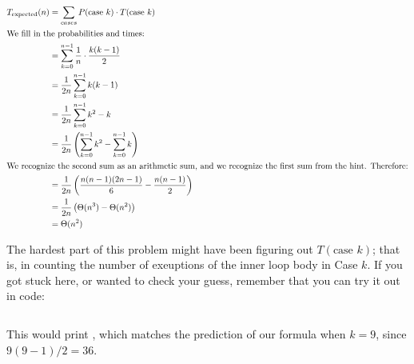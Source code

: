 \begin{prob}
\begin{subprobset}
\begin{subprob}
\begin{soln}
                \begin{align*}
                    T_\text{expected}(n)
                    &=
                        \sum_{cases}
                        P(\text{case } k) \cdot T(\text{case } k)
                        \\
                \intertext{We fill in the probabilities and times:}
                    &= \sum_{k = 0}^{n-1} \frac{1}{n} \cdot \frac{k(k-1)}{2} \\
                    &= \frac{1}{2n} \sum_{k = 0}^{n-1} k(k-1) \\
                    &= \frac{1}{2n} \sum_{k = 0}^{n-1} k^2 - k \\
                    &= \frac{1}{2n} \left( \sum_{k = 0}^{n-1} k^2 - \sum_{k = 0}^{n-1} k \right) \\
                    \intertext{We recognize the second sum as an arithmetic sum, and we recognize the first sum from
                    the hint. Therefore:}
                    &= \frac{1}{2n} \left( \frac{n(n-1)(2n-1)}{6} - \frac{n(n-1)}{2} \right) \\
                    &= \frac{1}{2n} \left( \Theta(n^3) - \Theta(n^2) \right) \\
                    &= \Theta(n^2)
                \end{align*}

                The hardest part of this problem might have been figuring out $T(\text{case } k)$; that is,
                in counting the number of exeuptions of the inner loop body in Case $k$. If you got stuck here,
                or wanted to check your guess, remember that you can try it out in code:

                \inputminted{python}{\thisdir/include-solution/loop-count.py}

                This would print , which matches the prediction of our
                formula when $k = 9$, since $9(9-1)/2 = 36$.

            \end{soln}

        \end{subprob}



    \end{subprobset}
\end{prob}
